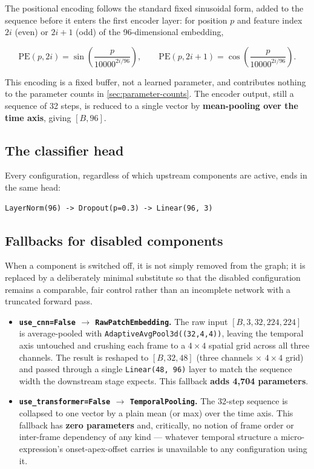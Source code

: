 The positional encoding follows the standard fixed sinusoidal form, added to the sequence before it enters the first encoder layer: for position $p$ and feature index $2i$ (even) or $2i+1$ (odd) of the 96-dimensional embedding,

\[
	\mathrm{PE}(p, 2i) = \sin\!\left(\frac{p}{10000^{2i/96}}\right), \qquad \mathrm{PE}(p, 2i+1) = \cos\!\left(\frac{p}{10000^{2i/96}}\right).
\]

This encoding is a fixed buffer, not a learned parameter, and contributes nothing to the parameter counts in \autoref{sec:parameter-counts}. The encoder output, still a sequence of 32 steps, is reduced to a single vector by \textbf{mean-pooling over the time axis}, giving $[B,96]$.

\subsection{The classifier head}
\label{sec:classifier-head}

Every configuration, regardless of which upstream components are active, ends in the same head:

\begin{verbatim}
LayerNorm(96) -> Dropout(p=0.3) -> Linear(96, 3)
\end{verbatim}

\subsection{Fallbacks for disabled components}
\label{sec:fallbacks-config}

When a component is switched off, it is not simply removed from the graph; it is replaced by a deliberately minimal substitute so that the disabled configuration remains a comparable, fair control rather than an incomplete network with a truncated forward pass.

\begin{itemize}
	\item \textbf{\texttt{use\_cnn=False} $\rightarrow$ \texttt{RawPatchEmbedding}.} The raw input $[B,3,32,224,224]$ is average-pooled with \texttt{AdaptiveAvgPool3d((32,4,4))}, leaving the temporal axis untouched and crushing each frame to a $4\times4$ spatial grid across all three channels. The result is reshaped to $[B,32,48]$ (three channels $\times$ $4\times4$ grid) and passed through a single \texttt{Linear(48, 96)} layer to match the sequence width the downstream stage expects. This fallback \textbf{adds 4,704 parameters}.
	\item \textbf{\texttt{use\_transformer=False} $\rightarrow$ \texttt{TemporalPooling}.} The 32-step sequence is collapsed to one vector by a plain mean (or max) over the time axis. This fallback has \textbf{zero parameters} and, critically, no notion of frame order or inter-frame dependency of any kind --- whatever temporal structure a micro-expression's onset-apex-offset carries is unavailable to any configuration using it.
\end{itemize}

